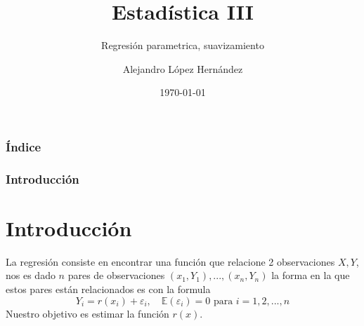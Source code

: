 \documentclass[aspectratio=169,spanish]{beamer}
\title{Estadística III}
\subtitle{Regresión parametrica, suavizamiento}
\author{Alejandro López Hernández}
\institute{FES Acatlán - UNAM}
\date{\today}
\begin{document}
\frame{\titlepage}

\begin{frame}
\frametitle{Índice}
\tableofcontents
\end{frame}

\begin{frame}
\frametitle{Introducción}
\section{Introducción}
La regresión consiste en encontrar una función que relacione 2 observaciones $X, Y$, nos es dado $n$ pares de observaciones $(x_1,Y_1),...,(x_n,Y_n)$ la forma en la que estos pares están relacionados es con la formula $$Y_i=r(x_i)+\varepsilon_i, \quad \mathbb{E}(\varepsilon_i)=0 \text{ para }i=1,2,...,n$$
Nuestro objetivo es estimar la función $r(x)$.
\end{frame}
\end{document}
